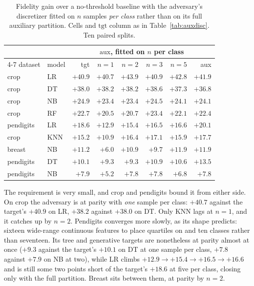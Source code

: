 \documentclass[sigconf,anonymous,review]{acmart}
\begin{document}
\begin{table}[t]
\centering
\setlength{\tabcolsep}{4pt}
\caption{Fidelity gain over a no-threshold baseline with the adversary's discretizer fitted on $n$
samples \emph{per class} rather than on its full auxiliary partition. Cells and $\text{tgt}$ column
as in Table~\ref{tab:auxdisc}. Ten paired splits.}
\label{tab:auxsize}
\begin{tabular}{llrrrrrr}
\toprule
 & & & \multicolumn{4}{c}{$\text{aux}$, fitted on $n$ per class} & \\
\cmidrule(lr){4-7}
dataset & model & tgt & $n{=}1$ & $n{=}2$ & $n{=}3$ & $n{=}5$ & aux \\
\midrule
crop      & LR  & $+40.9$ & $+40.7$ & $+43.9$ & $+40.9$ & $+42.8$ & $+41.9$ \\
crop      & DT  & $+38.0$ & $+38.2$ & $+38.2$ & $+38.6$ & $+37.3$ & $+36.8$ \\
crop      & NB  & $+24.9$ & $+23.4$ & $+23.4$ & $+24.5$ & $+24.1$ & $+24.1$ \\
crop      & RF  & $+22.7$ & $+20.5$ & $+20.7$ & $+23.4$ & $+22.1$ & $+22.4$ \\
pendigits & LR  & $+18.6$ & $+12.9$ & $+15.4$ & $+16.5$ & $+16.6$ & $+20.1$ \\
crop      & KNN & $+15.2$ & $+10.9$ & $+16.4$ & $+17.1$ & $+15.9$ & $+17.7$ \\
breast    & NB  & $+11.2$ & $+6.0$  & $+10.9$ & $+9.7$  & $+11.9$ & $+11.9$ \\
pendigits & DT  & $+10.1$ & $+9.3$  & $+9.3$  & $+10.9$ & $+10.6$ & $+13.5$ \\
pendigits & NB  & $+7.9$  & $+5.2$  & $+7.8$  & $+7.8$  & $+6.8$  & $+7.8$ \\
\bottomrule
\end{tabular}
\end{table}

The requirement is very small, and crop and pendigits bound it from either side. On crop the adversary
is at parity with \emph{one} sample per class: $+40.7$ against the target's $+40.9$ on LR, $+38.2$
against $+38.0$ on DT. Only KNN lags at $n{=}1$, and it catches up by $n{=}2$. Pendigits converges
more slowly, as its shape predicts: sixteen wide-range continuous features to place quartiles on and
ten classes rather than seventeen. Its tree and generative targets are nonetheless at parity almost at
once ($+9.3$ against the target's $+10.1$ on DT at one sample per class, $+7.8$ against $+7.9$ on NB
at two), while LR climbs $+12.9 \to +15.4 \to +16.5 \to +16.6$ and is still some two points short of
the target's $+18.6$ at five per class, closing only with the full partition. Breast sits between
them, at parity by $n{=}2$.
\end{document}
